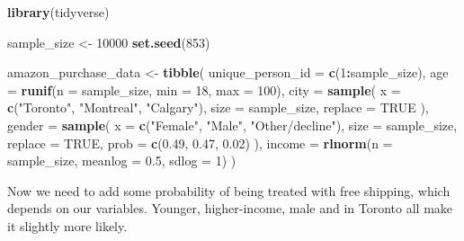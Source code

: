 \documentclass[
]{book}
\newenvironment{Shaded}{\begin{snugshade}}{\end{snugshade}}
\newcommand{\DataTypeTok}[1]{\textcolor[rgb]{0.13,0.29,0.53}{#1}}
\newcommand{\DecValTok}[1]{\textcolor[rgb]{0.00,0.00,0.81}{#1}}
\newcommand{\FloatTok}[1]{\textcolor[rgb]{0.00,0.00,0.81}{#1}}
\newcommand{\KeywordTok}[1]{\textcolor[rgb]{0.13,0.29,0.53}{\textbf{#1}}}
\newcommand{\NormalTok}[1]{#1}
\newcommand{\OperatorTok}[1]{\textcolor[rgb]{0.81,0.36,0.00}{\textbf{#1}}}
\newcommand{\OtherTok}[1]{\textcolor[rgb]{0.56,0.35,0.01}{#1}}
\newcommand{\StringTok}[1]{\textcolor[rgb]{0.31,0.60,0.02}{#1}}
\begin{document}
\begin{Shaded}
\begin{Highlighting}[]
\KeywordTok{library}\NormalTok{(tidyverse)}
\end{Highlighting}
\end{Shaded}

\begin{Shaded}
\begin{Highlighting}[]
\NormalTok{sample_size <-}\StringTok{ }\DecValTok{10000}
\KeywordTok{set.seed}\NormalTok{(}\DecValTok{853}\NormalTok{)}

\NormalTok{amazon_purchase_data <-}
\StringTok{  }\KeywordTok{tibble}\NormalTok{(}
    \DataTypeTok{unique_person_id =} \KeywordTok{c}\NormalTok{(}\DecValTok{1}\OperatorTok{:}\NormalTok{sample_size),}
    \DataTypeTok{age =} \KeywordTok{runif}\NormalTok{(}\DataTypeTok{n =}\NormalTok{ sample_size,}
                \DataTypeTok{min =} \DecValTok{18}\NormalTok{,}
                \DataTypeTok{max =} \DecValTok{100}\NormalTok{),}
    \DataTypeTok{city =} \KeywordTok{sample}\NormalTok{(}
      \DataTypeTok{x =} \KeywordTok{c}\NormalTok{(}\StringTok{"Toronto"}\NormalTok{, }\StringTok{"Montreal"}\NormalTok{, }\StringTok{"Calgary"}\NormalTok{),}
      \DataTypeTok{size =}\NormalTok{ sample_size,}
      \DataTypeTok{replace =} \OtherTok{TRUE}
\NormalTok{      ),}
    \DataTypeTok{gender =} \KeywordTok{sample}\NormalTok{(}
      \DataTypeTok{x =} \KeywordTok{c}\NormalTok{(}\StringTok{"Female"}\NormalTok{, }\StringTok{"Male"}\NormalTok{, }\StringTok{"Other/decline"}\NormalTok{),}
      \DataTypeTok{size =}\NormalTok{ sample_size,}
      \DataTypeTok{replace =} \OtherTok{TRUE}\NormalTok{,}
      \DataTypeTok{prob =} \KeywordTok{c}\NormalTok{(}\FloatTok{0.49}\NormalTok{, }\FloatTok{0.47}\NormalTok{, }\FloatTok{0.02}\NormalTok{)}
\NormalTok{      ),}
    \DataTypeTok{income =} \KeywordTok{rlnorm}\NormalTok{(}\DataTypeTok{n =}\NormalTok{ sample_size,}
                    \DataTypeTok{meanlog =} \FloatTok{0.5}\NormalTok{, }
                    \DataTypeTok{sdlog =} \DecValTok{1}\NormalTok{)}
\NormalTok{    )}
\end{Highlighting}
\end{Shaded}

Now we need to add some probability of being treated with free shipping, which depends on our variables. Younger, higher-income, male and in Toronto all make it slightly more likely.
\end{document}
